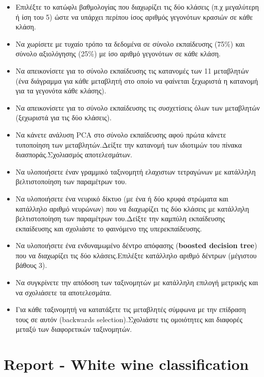 \documentclass[12pt,a4paper]{article}
\begin{document}
\begin{itemize}
\item[\cancel{a.}] Επιλέξτε το κατώφλι βαθμολογίας που διαχωρίζει τις δύο κλάσεις (π.χ μεγαλύτερη ή ίση του 5) ώστε να υπάρχει περίπου ίσος αριθμός γεγονότων κρασιών σε κάθε κλάση.
\item[\cancel{b.}] Να χωρίσετε με τυχαίο τρόπο τα δεδομένα σε σύνολο εκπαίδευσης (75\%) και σύνολο αξιολόγησης (25\%) με ίσο αριθμό γεγονότων σε κάθε κλάση.
\item[\cancel{c.}] Να απεικονίσετε για το σύνολο εκπαίδευσης τις κατανομές των 11 μεταβλητών (ένα διάγραμμα για κάθε μεταβλητή στο οποίο να φαίνεται ξεχωριστά η κατανομή για τα γεγονότα κάθε κλάσης).
\item[\cancel{d.}] Να απεικονίσετε για το σύνολο εκπαίδευσης τις συσχετίσεις όλων των μεταβλητών (ξεχωριστά για τις δύο κλάσεις).
\item[\cancel{e.}] Να κάνετε ανάλυση PCA στο σύνολο εκπαίδευσης αφού πρώτα κάνετε τυποποίηση των μεταβλητών.Δείξτε την κατανομή των ιδιοτιμών του πίνακα διασποράς.Σχολιασμός αποτελεσμάτων.
\item[\cancel{f.}] Να υλοποιήσετε έναν γραμμικό ταξινομητή ελαχιστων τετραγώνων με κατάλληλη βελτιστοποίηση των παραμέτρων του.
\item[\cancel{g.}] Να υλοποιήσετε ένα νευρικό δίκτυο (με ένα ή δύο κρυφά στρώματα και κατάλληλο αριθμό νευρώνων) που να διαχωρίζει τις δύο κλάσεις με κατάλληλη βελτιστοποίηση των παραμέτρων του.Δείξτε την καμπύλη εκπαίδευσης εκπαίδευσης και σχολιάστε το φαινόμενο της υπερεκπαίδευσης.
\item[\cancel{h.}] Να υλοποιήσετε ένα ενδυναμωμένο δέντρο απόφασης (\textbf{boosted decision tree}) που να διαχωρίζει τις δύο κλάσεις.Επιλέξτε κατάλληλο αριθμό δέντρων (μέγιστου βάθους 3).
\item[\cancel{i.}] Να συγκρίνετε την απόδοση των ταξινομητών με κατάλληλη επιλογή μετρικής και να σχολιάσετε τα αποτελεσμάτα.
\item[\cancel{j.}] Για κάθε ταξινομητή να κατατάξετε τις μεταβλητές σύμφωνα με την επίδραση τους σε αυτόν (backwards selection).Σχολιάστε τις ομοιότητες και διαφορές μεταξύ  των διαφορετικών ταξινομητών.



\end{itemize}


\newpage
\section{Report - White wine classification}
\end{document}
